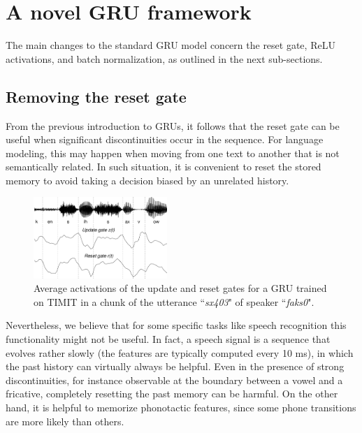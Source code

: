 \documentclass[journal]{IEEEtran}
\begin{document}
\section{A novel GRU framework} \label{sec:novel}
The main changes to the standard GRU model concern the reset gate, ReLU activations, and batch normalization, as outlined in the next sub-sections. 

\subsection{Removing the reset gate}
From the previous introduction to GRUs, it follows that the reset gate can be useful when significant discontinuities occur in the sequence. For language modeling, this may happen when moving from one text to another that is not semantically related. In such situation, it is convenient to reset the stored memory to avoid taking a decision biased by an unrelated history. 
 \begin{figure}[t!]
 \centering
 \includegraphics[width=0.45\textwidth]{plot_is17.png}
 \caption{Average activations of the update and reset gates for a GRU trained on TIMIT in a chunk of the utterance ``\textit{sx403}" of speaker ``\textit{faks0}".}
 \label{fig:im1}
 \end{figure}

Nevertheless, we believe that for some specific tasks like speech recognition this functionality might not be useful. 
In fact, a speech signal is a sequence that evolves rather slowly (the features are typically computed every 10 ms), in which the past history can virtually always be helpful.  
Even in the presence of strong discontinuities, for instance observable at the boundary between a vowel and a fricative, completely resetting the past memory can be harmful. On the other hand, it is helpful to memorize phonotactic features, since some phone transitions are more likely than others.
\end{document}
